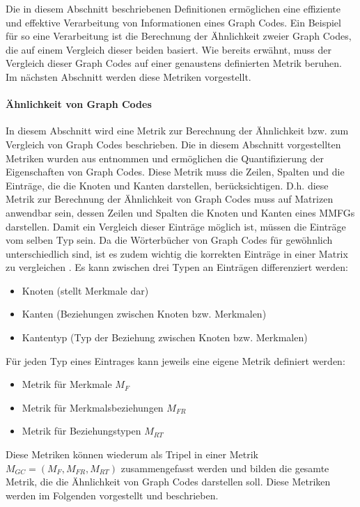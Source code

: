 Die in diesem Abschnitt beschriebenen Definitionen ermöglichen eine effiziente und effektive Verarbeitung von Informationen eines Graph Codes.
Ein Beispiel für so eine Verarbeitung ist die Berechnung der Ähnlichkeit zweier Graph Codes, die auf einem Vergleich dieser beiden basiert.
Wie bereits erwähnt, muss der Vergleich dieser Graph Codes auf einer genaustens definierten Metrik beruhen.
Im nächsten Abschnitt werden diese Metriken vorgestellt.

\paragraph{Ähnlichkeit von Graph Codes}
\label{sec2:sota:par:gc-similiarity}
In diesem Abschnitt wird eine Metrik zur Berechnung der Ähnlichkeit bzw. zum Vergleich von Graph Codes beschrieben.
Die in diesem Abschnitt vorgestellten Metriken wurden aus \cite{gc-2d-proj-mmfg} entnommen und ermöglichen die Quantifizierung der Eigenschaften von Graph Codes.
Diese Metrik muss die Zeilen, Spalten und die Einträge, die die Knoten und Kanten darstellen, berücksichtigen.
D.h. diese Metrik zur Berechnung der Ähnlichkeit von Graph Codes muss auf Matrizen anwendbar sein, dessen Zeilen und Spalten die Knoten und Kanten eines MMFGs darstellen.
Damit ein Vergleich dieser Einträge möglich ist, müssen die Einträge vom selben Typ sein.
Da die Wörterbücher von Graph Codes für gewöhnlich unterschiedlich sind, ist es zudem wichtig die korrekten Einträge in einer Matrix zu vergleichen \cite{gc-2d-proj-mmfg}.
Es kann zwischen drei Typen an Einträgen differenziert werden:
\begin{itemize}
    \item Knoten (stellt Merkmale dar)
    \item Kanten (Beziehungen zwischen Knoten bzw. Merkmalen)
    \item Kantentyp (Typ der Beziehung zwischen Knoten bzw. Merkmalen)
\end{itemize}
Für jeden Typ eines Eintrages kann jeweils eine eigene Metrik definiert werden:
\begin{itemize}
    \item Metrik für Merkmale $M_F$
    \item Metrik für Merkmalsbeziehungen $M_{FR}$
    \item Metrik für Beziehungstypen $M_{RT}$
\end{itemize}
Diese Metriken können wiederum als Tripel in einer Metrik $M_{GC} = (M_F, M_{FR}, M_{RT})$ zusammengefasst werden und bilden die gesamte Metrik, die die Ähnlichkeit von Graph Codes darstellen soll.
Diese Metriken werden im Folgenden vorgestellt und beschrieben.

